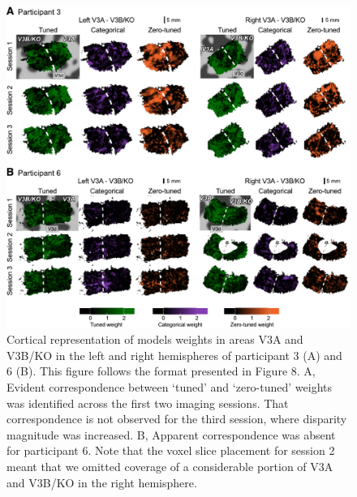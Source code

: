 \begin{figure}
  \centering
  \includegraphics[width=14cm, keepaspectratio]{fig9}
  \caption[Cortical representation of models weights for participants 3 and 6]{Cortical representation of models weights in areas V3A and V3B/KO in the left and right hemispheres of participant 3 (A) and 6 (B). This figure follows the format presented in Figure 8. A, Evident correspondence between `tuned' and `zero-tuned' weights was identified across the first two imaging sessions. That correspondence is not observed for the third session, where disparity magnitude was increased. B, Apparent correspondence was absent for participant 6. Note that the voxel slice placement for session 2 meant that we omitted coverage of a considerable portion of V3A and V3B/KO in the right hemisphere.}
  \label{fig:ch4fig9}
\end{figure}


